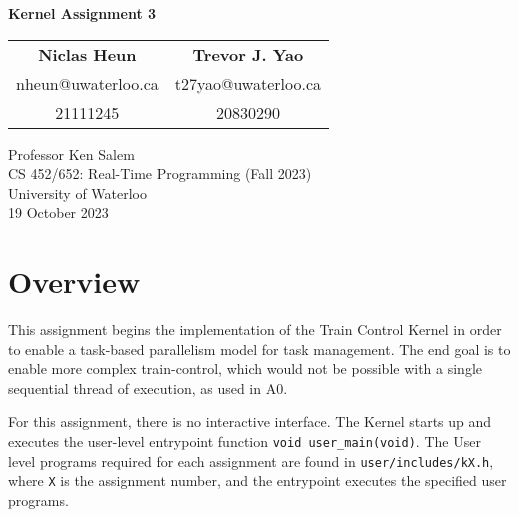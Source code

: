\documentclass[12pt, titlepage]{article}
\begin{document}
    \begin{titlepage}
        \begin{center}
            \vspace*{5em}
            \textbf{\LARGE Kernel Assignment 3}
            \vspace*{3em}

            \begin{tabular}{c@{\hskip 8em}c}
                \textbf{\large Niclas Heun} & \textbf{\large Trevor J. Yao} \\
                {\small nheun@uwaterloo.ca} & {\small t27yao@uwaterloo.ca} \\
                {\footnotesize 21111245} & {\footnotesize 20830290} \\
            \end{tabular}

            \vfill

            Professor Ken Salem \\
            CS 452/652: Real-Time Programming (Fall 2023) \\
            University of Waterloo \\
            19 October 2023

            \vspace*{5em}

        \end{center}
    \end{titlepage}


    \pagestyle{fancy}

    \tableofcontents
    \pagebreak

    \section{Overview}
    \label{sec:overview}

    This assignment begins the implementation of the Train Control Kernel in order to enable a task-based parallelism model for task management. The end goal is to enable more complex train-control, which would not be possible with a single sequential thread of execution, as used in A0.

    For this assignment, there is no interactive interface. The Kernel starts up and executes the user-level entrypoint function \verb`void user_main(void)`. The User level programs required for each assignment are found in \verb`user/includes/kX.h`, where \verb`X` is the assignment number, and the entrypoint executes the specified user programs.
\end{document}
